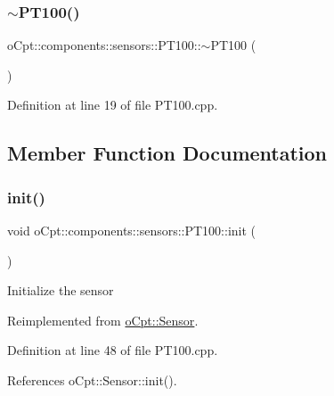\subsubsection{\texorpdfstring{$\sim$\+P\+T100()}{~PT100()}}
{\footnotesize\ttfamily o\+Cpt\+::components\+::sensors\+::\+P\+T100\+::$\sim$\+P\+T100 (\begin{DoxyParamCaption}{ }\end{DoxyParamCaption})}



Definition at line 19 of file P\+T100.\+cpp.



\subsection{Member Function Documentation}
\hypertarget{classo_cpt_1_1components_1_1sensors_1_1_p_t100_a296d0c3c2a55df465e127462c8c30215}{}\label{classo_cpt_1_1components_1_1sensors_1_1_p_t100_a296d0c3c2a55df465e127462c8c30215} 
\subsubsection{\texorpdfstring{init()}{init()}}
{\footnotesize\ttfamily void o\+Cpt\+::components\+::sensors\+::\+P\+T100\+::init (\begin{DoxyParamCaption}{ }\end{DoxyParamCaption})\hspace{0.3cm}{\ttfamily [virtual]}}

Initialize the sensor 

Reimplemented from \hyperlink{classo_cpt_1_1_sensor_aa612a305a9a3091dd62cd1afb9d4dd7d}{o\+Cpt\+::\+Sensor}.



Definition at line 48 of file P\+T100.\+cpp.



References o\+Cpt\+::\+Sensor\+::init().

